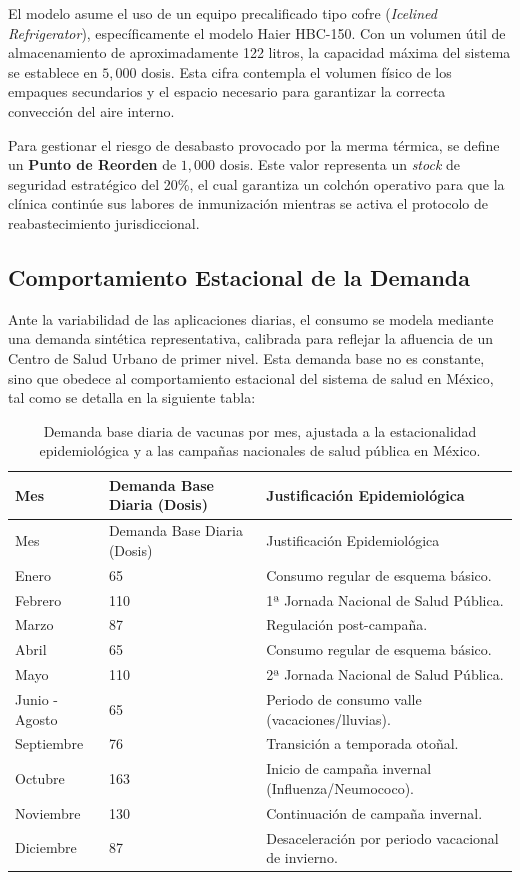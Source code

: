 \documentclass[
  spanish,
  letterpaper,
  DIV=11,
  numbers=noendperiod]{scrreprt}
\theoremstyle{plain}
\theoremstyle{plain}
\theoremstyle{plain}
\theoremstyle{definition}
\theoremstyle{remark}
\begin{document}
El modelo asume el uso de un equipo precalificado tipo cofre
(\emph{Icelined Refrigerator}), específicamente el modelo Haier HBC-150.
Con un volumen útil de almacenamiento de aproximadamente 122 litros, la
capacidad máxima del sistema se establece en \(5,000\) dosis. Esta cifra
contempla el volumen físico de los empaques secundarios y el espacio
necesario para garantizar la correcta convección del aire interno.

Para gestionar el riesgo de desabasto provocado por la merma térmica, se
define un \textbf{Punto de Reorden} de \(1,000\) dosis. Este valor
representa un \emph{stock} de seguridad estratégico del 20\%, el cual
garantiza un colchón operativo para que la clínica continúe sus labores
de inmunización mientras se activa el protocolo de reabastecimiento
jurisdiccional.

\subsection{Comportamiento Estacional de la
Demanda}\label{comportamiento-estacional-de-la-demanda}

Ante la variabilidad de las aplicaciones diarias, el consumo se modela
mediante una demanda sintética representativa, calibrada para reflejar
la afluencia de un Centro de Salud Urbano de primer nivel. Esta demanda
base no es constante, sino que obedece al comportamiento estacional del
sistema de salud en México, tal como se detalla en la siguiente tabla:

\begin{longtable}[]{@{}lll@{}}
\caption{Demanda base diaria de vacunas por mes, ajustada a la
estacionalidad epidemiológica y a las campañas nacionales de salud
pública en México.}\label{tbl-demanda-base}\tabularnewline
\toprule\noalign{}
Mes & Demanda Base Diaria (Dosis) & Justificación Epidemiológica \\
\midrule\noalign{}
\endfirsthead
\toprule\noalign{}
Mes & Demanda Base Diaria (Dosis) & Justificación Epidemiológica \\
\midrule\noalign{}
\endhead
\bottomrule\noalign{}
\endlastfoot
Enero & 65 & Consumo regular de esquema básico. \\
Febrero & 110 & 1ª Jornada Nacional de Salud Pública. \\
Marzo & 87 & Regulación post-campaña. \\
Abril & 65 & Consumo regular de esquema básico. \\
Mayo & 110 & 2ª Jornada Nacional de Salud Pública. \\
Junio - Agosto & 65 & Periodo de consumo valle (vacaciones/lluvias). \\
Septiembre & 76 & Transición a temporada otoñal. \\
Octubre & 163 & Inicio de campaña invernal (Influenza/Neumococo). \\
Noviembre & 130 & Continuación de campaña invernal. \\
Diciembre & 87 & Desaceleración por periodo vacacional de invierno. \\
\end{longtable}
\end{document}
